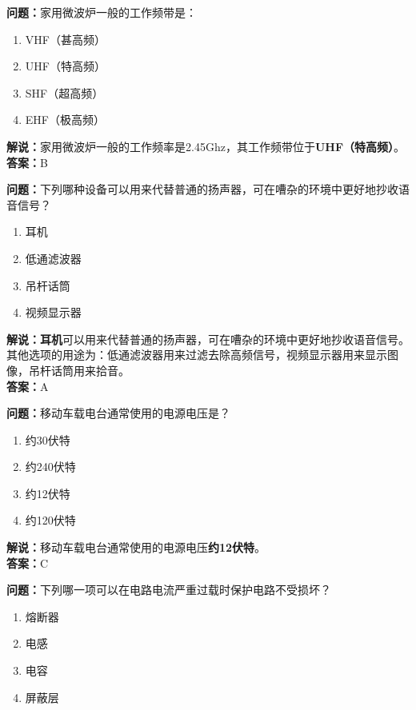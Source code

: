 \documentclass{ctexbook}
\begin{document}
\bigskip


\noindent\textbf{问题：}家用微波炉一般的工作频带是：

\begin{enumerate}[label=\Alph*), leftmargin=3em]
	\item VHF（甚高频）
	\item UHF（特高频）
	\item SHF（超高频）
	\item EHF（极高频）
\end{enumerate}

\noindent\textbf{解说：}家用微波炉一般的工作频率是2.45Ghz，其工作频带位于\textbf{UHF（特高频）}。\\\noindent\textbf{答案：}B


\bigskip


\noindent\textbf{问题：}下列哪种设备可以用来代替普通的扬声器，可在嘈杂的环境中更好地抄收语音信号？

\begin{enumerate}[label=\Alph*), leftmargin=3em]
	\item 耳机
	\item 低通滤波器
	\item 吊杆话筒
	\item 视频显示器
\end{enumerate}

\noindent\textbf{解说：耳机}可以用来代替普通的扬声器，可在嘈杂的环境中更好地抄收语音信号。其他选项的用途为：低通滤波器用来过滤去除高频信号，视频显示器用来显示图像，吊杆话筒用来拾音。\\\noindent\textbf{答案：}A

\bigskip


\noindent\textbf{问题：}移动车载电台通常使用的电源电压是？

\begin{enumerate}[label=\Alph*), leftmargin=3em]
	\item 约30伏特
	\item 约240伏特
	\item 约12伏特
	\item 约120伏特
\end{enumerate}

\noindent\textbf{解说：}移动车载电台通常使用的电源电压\textbf{约12伏特}。\\\noindent\textbf{答案：}C

\bigskip


\noindent\textbf{问题：}下列哪一项可以在电路电流严重过载时保护电路不受损坏？

\begin{enumerate}[label=\Alph*), leftmargin=3em]
	\item 熔断器
	\item 电感
	\item 电容
	\item 屏蔽层
\end{enumerate}
\end{document}
